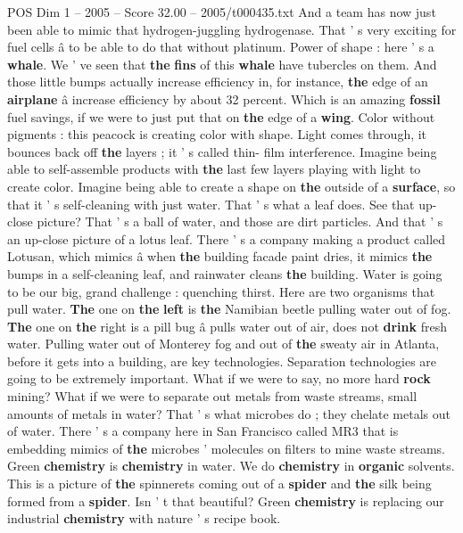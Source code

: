 \begin{textsample}{POS Dim 1 – 2005 – Score 32.00 – 2005/t000435.txt}
And a team has now just been able to mimic that hydrogen-juggling hydrogenase.
That ' s very exciting for fuel cells â to be able to do that without platinum.
Power of shape : here ' s a \textbf{whale}.
We ' ve seen that \textbf{the} \textbf{fins} of this \textbf{whale} have tubercles on them.
And those little bumps actually increase efficiency in, for instance, \textbf{the} edge of an \textbf{airplane} â increase efficiency by about 32 percent.
Which is an amazing \textbf{fossil} fuel savings, if we were to just put that on \textbf{the} edge of a \textbf{wing}.
Color without pigments : this peacock is creating color with shape.
Light comes through, it bounces back off \textbf{the} layers ; it ' s called thin- film interference.
Imagine being able to self-assemble products with \textbf{the} last few layers playing with light to create color.
Imagine being able to create a shape on \textbf{the} outside of a \textbf{surface}, so that it ' s self-cleaning with just water.
That ' s what a leaf does.
See that up-close picture?
That ' s a ball of water, and those are dirt particles.
And that ' s an up-close picture of a lotus leaf.
There ' s a company making a product called Lotusan, which mimics â when \textbf{the} building facade paint dries, it mimics \textbf{the} bumps in a self-cleaning leaf, and rainwater cleans \textbf{the} building.
Water is going to be our big, grand challenge : quenching thirst.
Here are two organisms that pull water. \textbf{The} one on \textbf{the} \textbf{left} is \textbf{the} Namibian beetle pulling water out of fog. \textbf{The} one on \textbf{the} right is a pill bug â pulls water out of air, does not \textbf{drink} fresh water.
Pulling water out of Monterey fog and out of \textbf{the} sweaty air in Atlanta, before it gets into a building, are key technologies.
Separation technologies are going to be extremely important.
What if we were to say, no more hard \textbf{rock} mining?
What if we were to separate out metals from waste streams, small amounts of metals in water?
That ' s what microbes do ; they chelate metals out of water.
There ' s a company here in San Francisco called MR3 that is embedding mimics of \textbf{the} microbes ' molecules on filters to mine waste streams.
Green \textbf{chemistry} is \textbf{chemistry} in water.
We do \textbf{chemistry} in \textbf{organic} solvents.
This is a picture of \textbf{the} spinnerets coming out of a \textbf{spider} and \textbf{the} silk being formed from a \textbf{spider}.
Isn ' t that beautiful?
Green \textbf{chemistry} is replacing our industrial \textbf{chemistry} with nature ' s recipe book.

\end{textsample}
